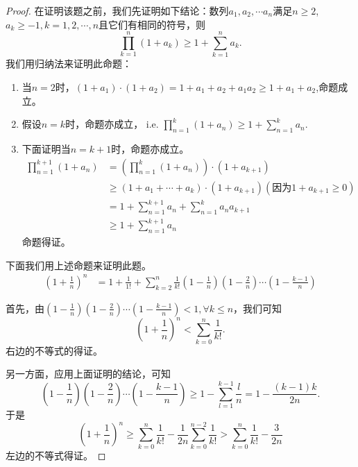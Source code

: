 \documentclass[utf8]{book}
\begin{document}
\begin{proof}
在证明该题之前，我们先证明如下结论：数列$a_1, a_2, \cdots a_n$满足$n \geq 2$, $a_k \geq -1, k=1,2,\cdots, n$且它们有相同的符号，则
$$\displaystyle\prod_{k=1}^n(1+a_k) \geq 1+\sum_{k=1}^na_k.$$
我们用归纳法来证明此命题：
\renewcommand\labelenumi{\normalfont(\theenumi)}
\begin{enumerate}
\item 当$n=2$时，$(1+a_1)\cdot(1+a_2) = 1 + a_1 + a_2 + a_1a_2 \geq 1 + a_1+a_2$,命题成立。
\item 假设$n=k$时，命题亦成立， i.e. $\displaystyle\prod_{n=1}^k(1+a_n) \geq 1+\sum_{n=1}^ka_n.$
\item 下面证明当$n=k+1$时，命题亦成立。 
\begin{equation*}
\begin{split}
\displaystyle\prod_{n=1}^{k+1}(1+a_n) &= \left(\displaystyle\prod_{n=1}^{k}(1+a_n)\right)\cdot(1+a_{k+1})\\&\geq(1+a_1+\cdots +a_k)\cdot(1+a_{k+1}) ({\text{因为$1+a_{k+1} \geq 0$}})\\
&=1+\sum_{n=1}^{k+1}a_n + \sum_{n=1}^{k}a_na_{k+1}\\
&\geq 1+\sum_{n=1}^{k+1}a_n
\end{split}
\end{equation*}
命题得证。
\end{enumerate}

下面我们用上述命题来证明此题。
\begin{equation*}
\begin{split}
\left(1+\frac{1}{n}\right)^n &=1+\frac{1}{1!} + \sum_{k=2}^n\frac{1}{k!}\left(1-\frac{1}{n}\right)\left(1-\frac{2}{n}\right)\cdots\left(1-\frac{k-1}{n}\right) 
\end{split}
\end{equation*}

首先，由$\left(1-\frac{1}{n}\right)\left(1-\frac{2}{n}\right)\cdots\left(1-\frac{k-1}{n}\right) < 1,\forall k \leq n$，我们可知$$\left(1+\frac{1}{n}\right)^n<\displaystyle\sum_{k=0}^n\frac{1}{k!}.$$
右边的不等式的得证。

另一方面，应用上面证明的结论，可知
$$\left(1-\frac{1}{n}\right)\left(1-\frac{2}{n}\right)\cdots\left(1-\frac{k-1}{n}\right) 
\geq 1 -\sum_{l=1}^{k-1}\frac{l}{n} = 1-\frac{(k-1)k}{2n}.$$
于是
$$\left(1+\frac{1}{n}\right)^n \geq \displaystyle\sum_{k=0}^n\frac{1}{k!} - \frac{1}{2n}\displaystyle\sum_{k=0}^{n-2}\frac{1}{k!} > \displaystyle\sum_{k=0}^n\frac{1}{k!}-\frac{3}{2n}$$
左边的不等式得证。
\end{proof}
\end{document}
